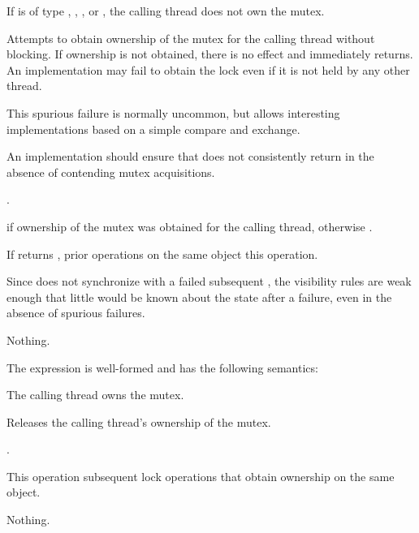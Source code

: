 \begin{itemdescr}
\pnum
\expects
If  is of type , ,
, or , the calling
thread does not own the mutex.

\pnum
\effects
Attempts to obtain ownership of the mutex for the calling thread without
blocking. If ownership is not obtained, there is no effect and 
immediately returns. An implementation may fail to obtain the lock even if it is not
held by any other thread.
\begin{note}
This spurious failure is normally uncommon, but
allows interesting implementations based on a simple
compare and exchange.
\end{note}
An implementation should ensure that  does not consistently return 
in the absence of contending mutex acquisitions.

\pnum
\returntype {}.

\pnum
\returns
{} if ownership of the mutex was obtained for the calling
thread, otherwise .

\pnum
\sync
If  returns , prior  operations
on the same object  this operation.
\begin{note}
Since  does not synchronize with a failed subsequent
, the visibility rules are weak enough that little would be
known about the state after a failure, even in the absence of spurious failures.
\end{note}

\pnum
\throws
Nothing.
\end{itemdescr}

\pnum
The expression  is well-formed and has the following semantics:

\begin{itemdescr}
\pnum
\expects
The calling thread owns the mutex.

\pnum
\effects
Releases the calling thread's ownership of the mutex.

\pnum
\returntype {}.

\pnum
\sync
This operation  subsequent
lock operations that obtain ownership on the same object.

\pnum
\throws
Nothing.
\end{itemdescr}

